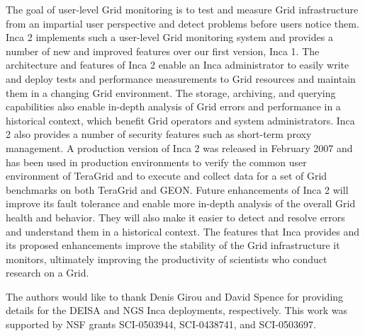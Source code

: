 \documentclass[times,10pt,twocolumn]{article}
\begin{document}
The goal of user-level Grid monitoring is to test and measure Grid
infrastructure from an impartial user perspective and detect problems before
users notice them.  Inca 2 implements such a user-level Grid monitoring system
and provides a number of new and improved features over our first version,
Inca 1.  The architecture and features of Inca 2 enable an Inca administrator
to easily write and deploy tests and performance measurements to Grid
resources and maintain them in a changing Grid environment.  The storage,
archiving, and querying capabilities also enable in-depth analysis of Grid
errors and performance in a historical context, which benefit Grid
operators and system administrators.  Inca 2 also provides a number of
security features such as short-term proxy management.
A production version of Inca 2 was released in February 2007 and
has been used in production environments to verify the common user environment
of TeraGrid and to execute and collect data for a set of Grid benchmarks on
both TeraGrid and GEON.  Future enhancements of Inca 2 will improve its fault
tolerance and enable more in-depth analysis of the overall Grid health and
behavior.  They will also make it easier to detect and resolve errors
and understand them in a historical context.  The features that Inca
provides and its proposed enhancements improve the stability of the
Grid infrastructure it monitors, ultimately improving the productivity of
scientists who conduct research on a Grid. 


The authors would like to thank Denis Girou and David Spence for providing
details for the DEISA and NGS Inca deployments, respectively.  This work was
supported by NSF grants SCI-0503944, SCI-0438741, and SCI-0503697.



\end{document}

